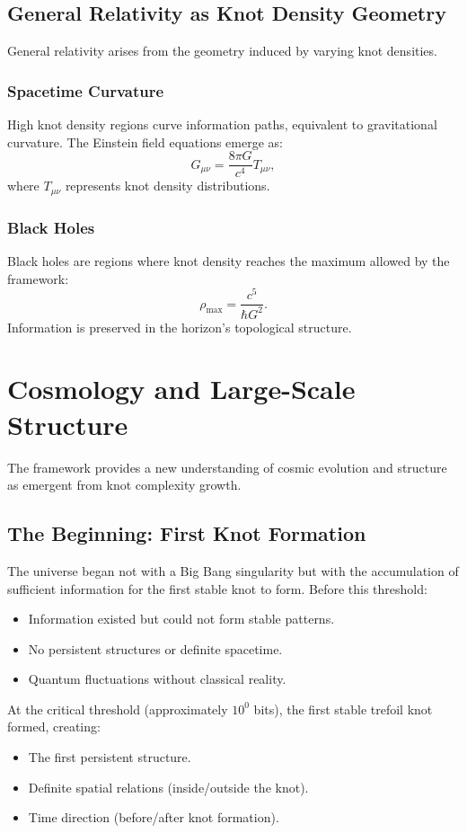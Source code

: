 \documentclass{article}
\begin{document}
\subsection{General Relativity as Knot Density Geometry}
General relativity arises from the geometry induced by varying knot densities.

\subsubsection{Spacetime Curvature}
High knot density regions curve information paths, equivalent to gravitational curvature. The Einstein field equations emerge as:
\[
G_{\mu\nu} = \frac{8\pi G}{c^4} T_{\mu\nu},
\]
where $T_{\mu\nu}$ represents knot density distributions.

\subsubsection{Black Holes}
Black holes are regions where knot density reaches the maximum allowed by the framework:
\[
\rho_{\max} = \frac{c^5}{\hbar G^2}.
\]
Information is preserved in the horizon's topological structure.

\section{Cosmology and Large-Scale Structure}
The framework provides a new understanding of cosmic evolution and structure as emergent from knot complexity growth.

\subsection{The Beginning: First Knot Formation}
The universe began not with a Big Bang singularity but with the accumulation of sufficient information for the first stable knot to form. Before this threshold:
\begin{itemize}
\item Information existed but could not form stable patterns.
\item No persistent structures or definite spacetime.
\item Quantum fluctuations without classical reality.
\end{itemize}
At the critical threshold (approximately $10^0$ bits), the first stable trefoil knot formed, creating:
\begin{itemize}
\item The first persistent structure.
\item Definite spatial relations (inside/outside the knot).
\item Time direction (before/after knot formation).
\end{itemize}
\end{document}

